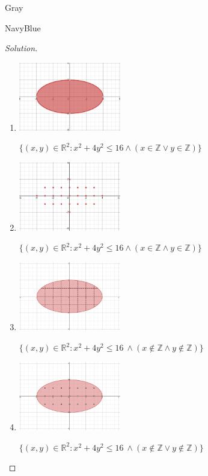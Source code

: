\documentclass[12pt]{amsart}
\theoremstyle{named}
\newenvironment{soln}
{\begin{color}{Gray}\begin{framed}\begin{color}{NavyBlue}\begin{proof}[Solution]
\doublespacing}
{\end{proof}\end{color}\end{framed}\end{color}}
\theoremstyle{definition}
\begin{document}
\begin{soln}
    \phantom{ }
	\begin{enumerate}
        \item \phantom{ }
        
        \includegraphics[width=12em]{media/1.1.png}

        $\{(x,y) \in \mathbb R^2:x^2+4y^2\leq16 \land (x \in \mathbb Z \lor y \in \mathbb Z)\}$

        \item \phantom{ }
        
        \includegraphics[width=12em]{media/1.2.png}

        $\{(x,y) \in \mathbb R^2:x^2+4y^2\leq16\land (x \in \mathbb Z \land y \in \mathbb Z)\}$

        \item \phantom{ }
        
        \includegraphics[width=12em]{media/1.3.png}

		$\{(x,y) \in \mathbb R^2:x^2+4y^2\leq16\ \land (x \notin \mathbb Z \land y \notin \mathbb Z)\}$

		\phantom{ }

		\item \phantom{ }
		
		\includegraphics[width=12em]{media/1.4.png}
		
		$\{(x,y) \in \mathbb R^2:x^2+4y^2\leq16\ \land (x \notin \mathbb Z \lor y \notin \mathbb Z)\}$
    \end{enumerate}
\end{soln}
\end{document}
